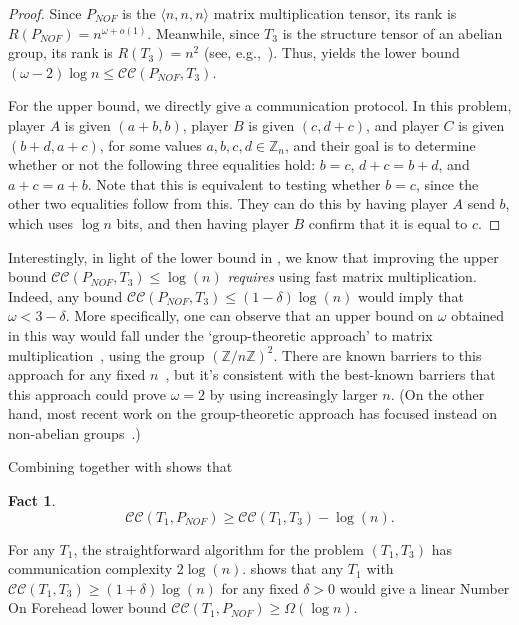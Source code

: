 \documentclass[10pt,a4paper]{article}
\newtheorem{fact}[theorem]{Fact}
\newcommand{\cc}{\mathcal{CC}}
\begin{document}
\begin{proof}
    Since $P_{NOF}$ is the $\langle n,n,n \rangle$ matrix multiplication tensor, its rank is $R(P_{NOF}) = n^{\omega + o(1)}$. Meanwhile, since $T_3$ is the structure tensor of an abelian group, its rank is $R(T_3) = n^2$ (see, e.g.,~\cite[{Theorem 2.3 and Theorem 4.1}]{CU03}). Thus,  yields the lower bound $(\omega - 2) \log n \leq \cc(P_{NOF}, T_3)$.
    
    For the upper bound, we directly give a communication protocol. In this problem, player $A$ is given $(a+b,b)$, player $B$ is given $(c,d+c)$, and player $C$ is given $(b+d,a+c)$, for some values $a,b,c,d \in \mathbb{Z}_n$, and their goal is to determine whether or not the following three equalities hold: $b=c$, $d+c=b+d$, and $a+c=a+b$. Note that this is equivalent to testing whether $b=c$, since the other two equalities follow from this. They can do this by having player $A$ send $b$, which uses $\log n$ bits, and then having player $B$ confirm that it is equal to $c$.
\end{proof}

Interestingly, in light of the lower bound in , we know that improving the upper bound $\cc(P_{NOF}, T_3) \leq \log(n)$ \emph{requires} using fast matrix multiplication. Indeed, any bound $\cc(P_{NOF}, T_3) \leq (1 - \delta) \log(n)$ would imply that $\omega < 3 - \delta$. More specifically, one can observe that an upper bound on $\omega$ obtained in this way would fall under the `group-theoretic approach' to matrix multiplication~\cite{CU03}, using the group $(\mathbb{Z} / n\mathbb{Z})^2$. There are known barriers to this approach for any fixed $n$~\cite{BCHGNSU17}, but it's consistent with the best-known barriers that this approach could prove $\omega = 2$ by using increasingly larger $n$. (On the other hand, most recent work on the group-theoretic approach has focused instead on non-abelian groups~\cite{BCGPU22}.)


Combining  together with  shows that
\begin{fact}\label{fact:noftogroup}
    $$\cc(T_1, P_{NOF}) \geq \cc(T_1, T_3) - \log(n).$$
\end{fact}
For any $T_1$, the straightforward algorithm for the problem $(T_1, T_3)$ has communication complexity $2 \log (n)$.  shows that any $T_1$ with $\cc(T_1, T_3) \geq (1 + \delta) \log (n)$ for any fixed $\delta>0$ would give a linear Number On Forehead lower bound $\cc(T_1, P_{NOF}) \geq \Omega( \log n)$.
\end{document}
